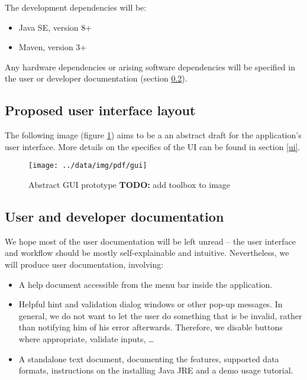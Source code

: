 \documentclass[10pt,a4paper,oneside]{article}
\newcommand{\TODO}[1]{{\textbf{TODO:} #1}} %
\begin{document}
The development dependencies will be:
\begin{itemize}
\item Java SE, version 8+
\item Maven, version 3+
\end{itemize}

Any hardware dependencies or arising software dependencies will be specified in the user or developer documentation (section \ref{docs}).

\subsection{Proposed user interface layout} \label{ui-layout}

The following image (figure \ref{fig:gui}) aims to be a an abstract draft for the application's user interface.
More details on the specifics of the UI can be found in section \ref{ui}.
\begin{figure}[h]
        \centering
        \texttt{[image: ../data/img/pdf/gui]}
        \caption{Abstract GUI prototype \TODO add toolbox to image}
        \label{fig:gui}
\end{figure}


\subsection{User and developer documentation} \label{docs}

We hope most of the user documentation will be left unread -- the user interface and workflow should be
mostly self-explainable and intuitive.
Nevertheless, we will produce user documentation, involving:
\begin{itemize}
\item A help document accessible from the menu bar inside the application.
\item Helpful hint and validation dialog windows or other pop-up messages. In general, we do not want to let the user do something that is be invalid, rather than notifying him of his error afterwards. Therefore, we disable buttons where appropriate, validate inputs, \ldots
\item A standalone text document, documenting the features, supported data formats, instructions on the installing Java JRE and a demo usage tutorial.
\end{itemize}
\end{document}
